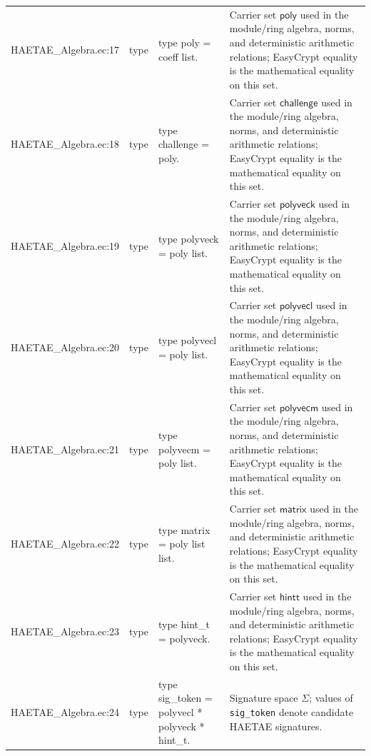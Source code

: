 \documentclass[10pt]{article}
\newcommand{\EC}[1]{\texttt{#1}}
\begin{document}
\begin{longtable}{L{0.11\textwidth}L{0.055\textwidth}L{0.385\textwidth}L{0.41\textwidth}}
HAETAE\_\allowbreak{}Algebra.\allowbreak{}ec:\allowbreak{}17 & type & {\ttfamily\scriptsize type poly = coeff list.} & Carrier set $\mathsf{poly}$ used in the module/ring algebra, norms, and deterministic arithmetic relations; EasyCrypt equality is the mathematical equality on this set. \\
HAETAE\_\allowbreak{}Algebra.\allowbreak{}ec:\allowbreak{}18 & type & {\ttfamily\scriptsize type challenge = poly.} & Carrier set $\mathsf{challenge}$ used in the module/ring algebra, norms, and deterministic arithmetic relations; EasyCrypt equality is the mathematical equality on this set. \\
HAETAE\_\allowbreak{}Algebra.\allowbreak{}ec:\allowbreak{}19 & type & {\ttfamily\scriptsize type polyveck = poly list.} & Carrier set $\mathsf{polyveck}$ used in the module/ring algebra, norms, and deterministic arithmetic relations; EasyCrypt equality is the mathematical equality on this set. \\
HAETAE\_\allowbreak{}Algebra.\allowbreak{}ec:\allowbreak{}20 & type & {\ttfamily\scriptsize type polyvecl = poly list.} & Carrier set $\mathsf{polyvecl}$ used in the module/ring algebra, norms, and deterministic arithmetic relations; EasyCrypt equality is the mathematical equality on this set. \\
HAETAE\_\allowbreak{}Algebra.\allowbreak{}ec:\allowbreak{}21 & type & {\ttfamily\scriptsize type polyvecm = poly list.} & Carrier set $\mathsf{polyvecm}$ used in the module/ring algebra, norms, and deterministic arithmetic relations; EasyCrypt equality is the mathematical equality on this set. \\
HAETAE\_\allowbreak{}Algebra.\allowbreak{}ec:\allowbreak{}22 & type & {\ttfamily\scriptsize type matrix = poly list list.} & Carrier set $\mathsf{matrix}$ used in the module/ring algebra, norms, and deterministic arithmetic relations; EasyCrypt equality is the mathematical equality on this set. \\
HAETAE\_\allowbreak{}Algebra.\allowbreak{}ec:\allowbreak{}23 & type & {\ttfamily\scriptsize type hint\_\allowbreak{}t = polyveck.} & Carrier set $\mathsf{hintt}$ used in the module/ring algebra, norms, and deterministic arithmetic relations; EasyCrypt equality is the mathematical equality on this set. \\
HAETAE\_\allowbreak{}Algebra.\allowbreak{}ec:\allowbreak{}24 & type & {\ttfamily\scriptsize type sig\_\allowbreak{}token = polyvecl * polyveck * hint\_\allowbreak{}t.} & Signature space $\Sigma$; values of \EC{sig\_token} denote candidate HAETAE signatures. \\

\end{longtable}
\end{document}
